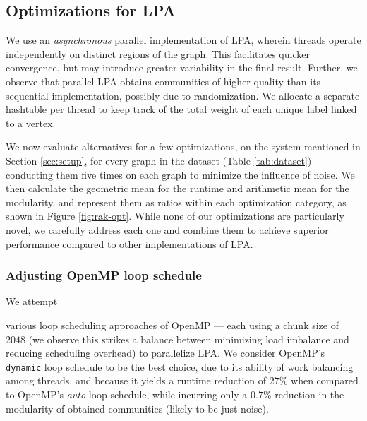 \subsection{Optimizations for LPA}
\label{sec:lpa}

We use an \textit{asynchronous} parallel implementation of LPA, wherein threads operate independently on distinct regions of the graph. This facilitates quicker convergence, but may introduce greater variability in the final result. Further, we observe that parallel LPA obtains communities of higher quality than its sequential implementation, possibly due to randomization. We allocate a separate hashtable per thread to keep track of the total weight of each unique label linked to a vertex.

We now evaluate alternatives for a few optimizations, on the system mentioned in Section \ref{sec:setup}, for every graph in the dataset (Table \ref{tab:dataset}) --- conducting them five times on each graph to minimize the influence of noise. We then calculate the geometric mean for the runtime and arithmetic mean for the modularity, and represent them as ratios within each optimization category, as shown in Figure \ref{fig:rak-opt}. While none of our optimizations are particularly novel, we carefully address each one and combine them to achieve superior performance compared to other implementations of LPA.



\subsubsection{Adjusting OpenMP loop schedule}

We attempt various loop scheduling approaches of OpenMP --- each using a chunk size of $2048$ (we observe this strikes a balance between minimizing load imbalance and reducing scheduling overhead) to parallelize LPA. We consider OpenMP's \verb|dynamic| loop schedule to be the best choice, due to its ability of work balancing among threads, and because it yields a runtime reduction of $27\%$ when compared to OpenMP's \textit{auto} loop schedule, while incurring only a $0.7\%$ reduction in the modularity of obtained communities (likely to be just noise).


